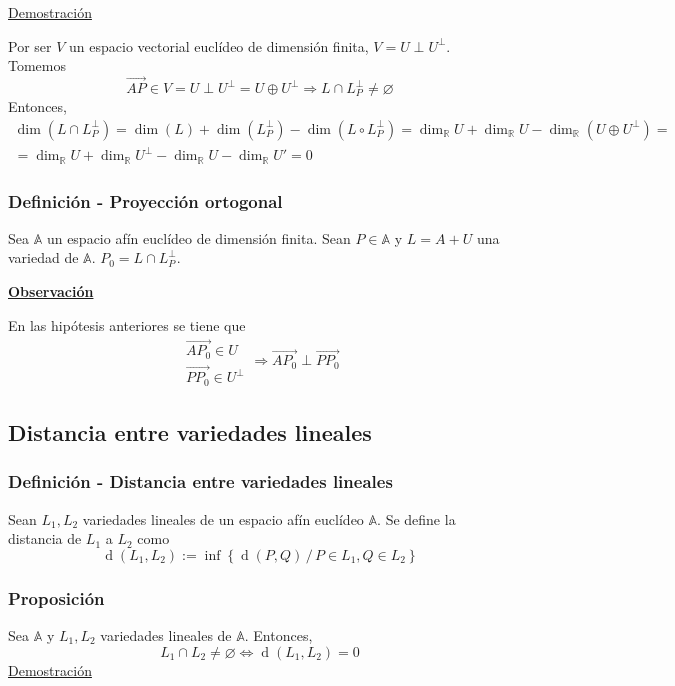 \documentclass[12pt, a4paper, ones, notitlepage, openany,titlepage]{article}
\newcommand{\demostracion}{\noindent\underline{Demostración}}
\newcommand{\observacion}{\noindent\underline{\textbf{Observación}}}
\newcommand{\distancia}[1]{\operatorname{d}(#1)}
\begin{document}
\demostracion

Por ser $V$ un espacio vectorial euclídeo de dimensión finita, $V = U \perp U^\perp$. Tomemos
$$
\overrightarrow{AP} \in V = U \perp U^\perp = U \oplus U^\perp \Longrightarrow L \cap L_P^\perp \neq \varnothing
$$
Entonces,
\begin{gather*}
\dim(L \cap L_P^\perp) = \dim(L) + \dim(L_P^\perp) - \dim(L \circ L_P^\perp) = \dim_\mathbb{R}U + \dim_\mathbb{R}U - \dim_\mathbb{R}(U \oplus U^\perp) = \\ = \dim_\mathbb{R} U + \dim_\mathbb{R} U^\perp - \dim_\mathbb{R} U - \dim_\mathbb{R} U' = 0
\end{gather*}

\subsubsection{Definición - Proyección ortogonal}
Sea $\mathbb{A}$ un espacio afín euclídeo de dimensión finita. Sean $P \in \mathbb{A}$ y $L = A + U$ una variedad de $\mathbb{A}$. $P_0 = L \cap L_P^\perp$.

\observacion

En las hipótesis anteriores se tiene que
$$
\begin{array}{r}
	\overrightarrow{AP_0} \in U \\
	\overrightarrow{PP_0} \in U^\perp
\end{array} \Longrightarrow \overrightarrow{AP_0} \perp \overrightarrow{PP_0}
$$

\subsection{Distancia entre variedades lineales}

\subsubsection{Definición - Distancia entre variedades lineales}
Sean $L_1, L_2$ variedades lineales de un espacio afín euclídeo $\mathbb{A}$. Se define la distancia de $L_1$ a $L_2$ como
$$
\distancia{L_1,L_2} := \inf \left\{\distancia{P,Q} \,/\, P \in L_1, Q \in L_2\right\}
$$

\subsubsection{Proposición}
Sea $\mathbb{A}$ y $L_1, L_2$ variedades lineales de $\mathbb{A}$. Entonces,
$$
L_1 \cap L_2 \neq \varnothing \Longleftrightarrow \distancia{L_1, L_2} = 0
$$
\demostracion
\end{document}
